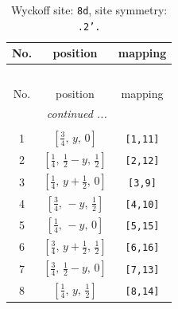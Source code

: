 \documentclass[fleqn,8pt]{jsarticle}
\begin{document}
\begin{longtable}{ccc}
\caption{Wyckoff site: {\tt 8d}, site symmetry: {\tt .2'.}}
 \\
 \hline \hline
No. & position & mapping \\ \hline \endfirsthead

\multicolumn{2}{l}{\tablename\ \thetable{}} \\
 \hline \hline
No. & position & mapping \\ \hline \endhead

 \hline \hline
\multicolumn{2}{r}{\footnotesize\it continued ...} \\ \endfoot

 \hline \hline
\multicolumn{2}{r}{} \\ \endlastfoot

1 & $\left[ \frac{3}{4},\, y,\, 0 \right]$ & {\tt [1,11]} \\ \hline
2 & $\left[ \frac{1}{4},\, \frac{1}{2} - y,\, \frac{1}{2} \right]$ & {\tt [2,12]} \\ \hline
3 & $\left[ \frac{1}{4},\, y + \frac{1}{2},\, 0 \right]$ & {\tt [3,9]} \\ \hline
4 & $\left[ \frac{3}{4},\, - y,\, \frac{1}{2} \right]$ & {\tt [4,10]} \\ \hline
5 & $\left[ \frac{1}{4},\, - y,\, 0 \right]$ & {\tt [5,15]} \\ \hline
6 & $\left[ \frac{3}{4},\, y + \frac{1}{2},\, \frac{1}{2} \right]$ & {\tt [6,16]} \\ \hline
7 & $\left[ \frac{3}{4},\, \frac{1}{2} - y,\, 0 \right]$ & {\tt [7,13]} \\ \hline
8 & $\left[ \frac{1}{4},\, y,\, \frac{1}{2} \right]$ & {\tt [8,14]} \\
\end{longtable}
\renewcommand{\arraystretch}{1.2}
\end{document}
